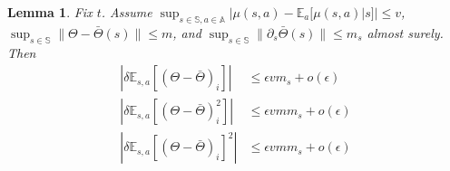 \documentclass[10.5pt]{article}
\newcommand\bb{\mathbb}
\newtheorem{lemma}{Lemma}
\begin{document}
\begin{lemma}
  Fix $t$. Assume
  $\sup_{s\in \bb S,a\in \bb A}|\mu(s,a) - \bb E_a[\mu(s,a)|s] | \leq  v$,
  $\sup_{s\in \bb S}\| \Theta - \bar \Theta(s)\| \leq  m$, and
  $\sup_{s\in \bb S}\|\partial_s \bar \Theta(s)\| \leq m_s$
  almost surely.
  Then
  \begin{align*}
    |\delta \bb E_{s,a}[(\Theta - \bar \Theta)_i]| &\leq \epsilon v m_s + o(\epsilon)\\
    |\delta \bb E_{s,a}[(\Theta - \bar \Theta)^2_i]| &\leq \epsilon v m m_s + o(\epsilon)\\
    |\delta \bb E_{s,a}[(\Theta - \bar \Theta)_i]^2| &\leq \epsilon v m m_s + o(\epsilon)
  \end{align*}






\end{lemma}
\end{document}
